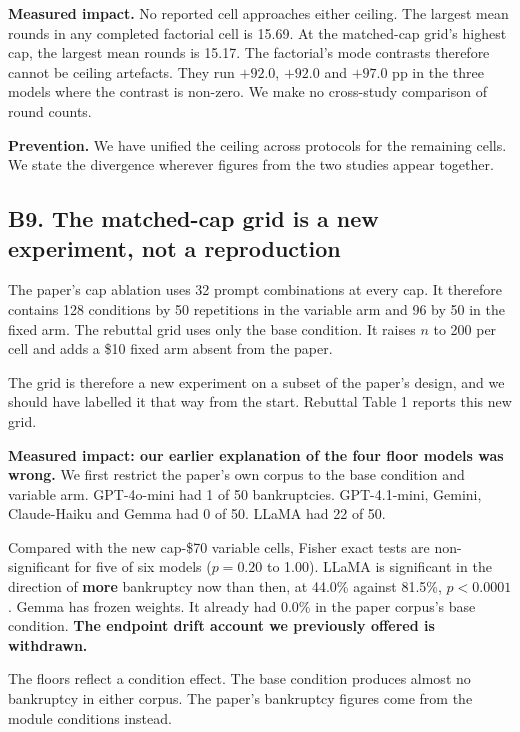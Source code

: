\textbf{Measured impact.} No reported cell approaches either ceiling. The largest mean rounds in
any completed factorial cell is 15.69. At the matched-cap grid's highest cap, the largest mean
rounds is 15.17. The factorial's mode contrasts therefore cannot be ceiling artefacts. They run
$+92.0$, $+92.0$ and $+97.0$ pp in the three models where the contrast is non-zero. We make no
cross-study comparison of round counts.

\textbf{Prevention.} We have unified the ceiling across protocols for the remaining cells. We
state the divergence wherever figures from the two studies appear together.


\subsection*{B9. The matched-cap grid is a new experiment, not a reproduction}

The paper's cap ablation uses 32 prompt combinations at every cap. It therefore contains 128
conditions by 50 repetitions in the variable arm and 96 by 50 in the fixed arm. The rebuttal grid
uses only the base condition. It raises $n$ to 200 per cell and adds a \$10 fixed arm absent from
the paper.

The grid is therefore a new experiment on a subset of the paper's design, and we should have
labelled it that way from the start. Rebuttal Table 1 reports this new grid.

\textbf{Measured impact: our earlier explanation of the four floor models was wrong.} We first
restrict the paper's own corpus to the base condition and variable arm. GPT-4o-mini had 1 of 50
bankruptcies. GPT-4.1-mini, Gemini, Claude-Haiku and Gemma had 0 of 50. LLaMA had 22 of 50.

Compared with the new cap-\$70 variable cells, Fisher exact tests are non-significant for five of
six models ($p = 0.20$ to 1.00). LLaMA is significant in the direction of \textbf{more} bankruptcy
now than then, at 44.0\% against 81.5\%, $p < 0.0001$. Gemma has frozen weights. It already had
0.0\% in the paper corpus's base condition. \textbf{The endpoint drift account we previously
offered is withdrawn.}

The floors reflect a condition effect. The base condition produces almost no bankruptcy in either
corpus. The paper's bankruptcy figures come from the module conditions instead.

